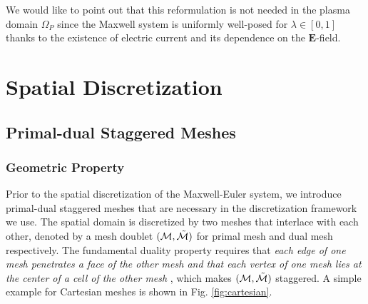 \documentclass{article}
\begin{document}
We would like to point out that this reformulation is not needed in the plasma domain $\Omega_P$ since the Maxwell system is uniformly well-posed for $\lambda \in [0,1]$ thanks to the existence of electric current and its dependence on the $\mathbf{E}$-field. 

\begin{comment}
To devise an AP scheme, the dependence of the stability constraints of $h$ on $\lambda$ has to be removed. This is mainly achieved by utilizing implicit time-stepping for certain terms. As is summarized by \cite{degond_2017}, AP schemes aim to bridge several sets of equations describing the system in different regimes, rather than to alleviate the stability constraints of the numerical methods. In this sense, a fully-implicit scheme is likely to be overkill and thus a smart construction is necessary. The second consideration goes to the identification of a compatible boundary conditions for both regimes, which would be shown to be essential for the numerical stability.      

In the following sections, we first briefly discuss the 1D scheme for the Maxwell-Euler system devised by \cite{degond_2012} on which our work us built. This section also serves as a preliminary case study such that readers can better understand the 3D scheme.
\end{comment}

\section{Spatial Discretization}
\subsection{Primal-dual Staggered Meshes}
\subsubsection{Geometric Property}
Prior to the spatial discretization of the Maxwell-Euler system, we introduce primal-dual staggered meshes that are necessary in the discretization framework we use. The spatial domain is discretized by two meshes that interlace with each other, denoted by a mesh doublet $(\mathcal{M}, \Tilde{\mathcal{M}})$ for primal mesh and dual mesh respectively. The fundamental duality property requires that \emph{each edge of one mesh penetrates a face of the other mesh and that each vertex of one mesh lies at the center of a cell of the other mesh} \citep{weiland_2003}, which makes $(\mathcal{M}, \Tilde{\mathcal{M}})$ staggered. A simple example for Cartesian meshes is shown in Fig. \ref{fig:cartesian}.
\end{document}
